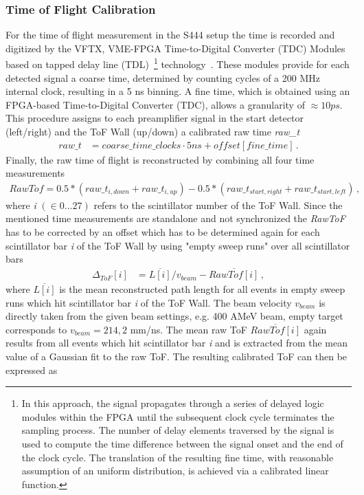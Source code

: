 \subsubsection{Time of Flight Calibration}
For the time of flight measurement in the S444 setup the time is recorded and digitized by the VFTX,  VME-FPGA Time-to-Digital Converter (TDC) Modules based on tapped delay line (TDL)~\footnote{In this approach, the signal propagates through a series of delayed logic modules within the FPGA until the subsequent clock cycle terminates the sampling process. The number of delay elements traversed by the signal is used to compute the time difference between the signal onset and the end of the clock cycle. The translation of the resulting fine time, with reasonable assumption of an uniform distribution, is achieved via a calibrated linear function.} technology~\cite{bayer2009development}. These modules provide for each detected signal a coarse time, determined by counting cycles of a 200 MHz internal clock, resulting in a 5 ns binning. A fine time, which is obtained using an FPGA-based Time-to-Digital Converter (TDC), allows a granularity of $\approx 10 ps$. This procedure assigns to each preamplifier signal in the start detector (left/right) and the ToF Wall (up/down) a calibrated raw time \textit{raw\_t}
\begin{align*}
raw\_t &= coarse\_time\_clocks  \cdot 5ns + offset[fine\_time] \, .
\end{align*}
Finally, the raw time of flight is reconstructed by combining all four time measurements
\begin{gather}
RawTof = 0.5*(raw\_t_{i,down}+raw\_t_{i,up}) - 0.5*(raw\_t_{start,right}+raw\_t_{start,left}) \, ,
\end{gather}
where \textit{i} $(\in 0...27)$ refers to the scintillator number of the ToF Wall. Since the mentioned time measurements are standalone and not synchronized the \textit{RawToF} has to be corrected by an offset which has to be determined again for each scintillator bar \textit{i} of the ToF Wall by using "empty sweep runs" over all scintillator bars
\begin{align*}
\Delta_{ToF}[i] &= \overline{L[i]}/v_{beam} - \overline{RawTof[i]} \, ,
\end{align*} 
where $\overline{L[i]}$ is the mean reconstructed path length for all events in empty sweep runs which hit scintillator bar \textit{i} of the ToF Wall. The beam velocity $v_{beam}$ is directly taken from the given beam settings, e.g. 400 AMeV beam, empty target corresponds to $v_{beam} = 214,2$ mm/ns. The mean raw ToF $\overline{RawTof[i]}$ again results from all events which hit scintillator bar \textit{i} and is extracted from the mean value of a Gaussian fit to the raw ToF. The resulting calibrated ToF can then be expressed as
